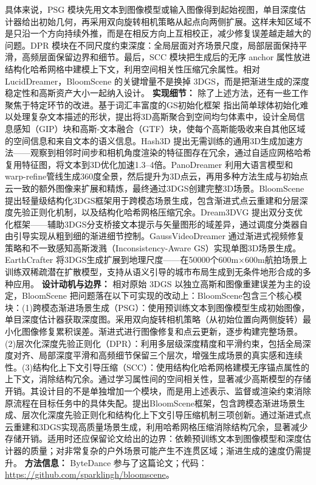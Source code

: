 具体来说，PSG 模块先用文本到图像模型或输入图像得到起始视图，单目深度估计器给出初始几何，再采用双向旋转相机策略从起点向两侧扩展。这样未知区域不是只沿一个方向持续外推，而是在相反方向上互相校正，减少修复误差越走越大的问题。DPR 模块在不同尺度约束深度：全局层面对齐场景尺度，局部层面保持平滑，高频层面保留边界和细节。最后，SCC 模块把生成后的无序 anchor 属性放进结构化哈希网格中建模上下文，利用空间相关性压缩冗余属性。相对 LucidDreamer，BloomScene 的关键增量不是换掉 3DGS，而是把渐进生成的深度稳定性和高斯资产大小一起纳入设计。
\textbf{实现细节：} 除了上述方法，还有一些工作聚焦于特定环节的改进。基于词汇丰富度的GS初始化框架 指出简单球体初始化难以处理复杂文本描述的形状，提出将3D高斯聚合到空间均匀体素中，设计全局信息感知（GIP）块和高斯-文本融合（GTF）块，使每个高斯能吸收来自其他区域的空间信息和来自文本的语义信息。Hash3D 提出无需训练的通用3D生成加速方法——观察到相邻时间步和相机角度渲染的特征图存在冗余，通过自适应网格哈希复用特征图，将文本到3D优化加速1.3--4倍。PanoDreamer 利用大语言模型和warp-refine管线生成360度全景，然后提升为3D点云，再用多种方法生成与初始点云一致的额外图像来扩展和精炼，最终通过3DGS创建完整3D场景。BloomScene 提出轻量级结构化3DGS框架用于跨模态场景生成，包含渐进式点云重建和分层深度先验正则化机制，以及结构化哈希网格压缩冗余。Dream3DVG 提出双分支优化框架——辅助3DGS分支桥接文本提示与矢量图形的域差异，通过调度分类器自由引导实现从粗到细的渐进细节控制。GaussVideoDreamer 通过渐进式视频修复策略和不一致感知高斯泼溅（Inconsistency-Aware GS）实现单图3D场景生成。EarthCrafter 将3DGS生成扩展到地理尺度——在50000个600m$\times$600m航拍场景上训练双稀疏潜在扩散模型，支持从语义引导的城市布局生成到无条件地形合成的多种应用。
\textbf{设计动机与边界：} 相对原始 3DGS 以独立高斯和图像重建误差为主的设定，BloomScene 把问题落在以下可实现的改动上：BloomScene包含三个核心模块：(1)跨模态渐进场景生成（PSG）：使用预训练文本到图像模型生成初始图像，单目深度估计器获取深度图。采用双向旋转相机策略（从初始位置向两侧旋转）最小化图像修复累积误差。渐进式进行图像修复和点云更新，逐步构建完整场景。(2)层次化深度先验正则化（DPR）：利用多层级深度精度和平滑约束，包括全局深度对齐、局部深度平滑和高频细节保留三个层次，增强生成场景的真实感和连续性。(3)结构化上下文引导压缩（SCC）：使用结构化哈希网格建模无序锚点属性的上下文，消除结构冗余。通过学习属性间的空间相关性，显著减少高斯模型的存储开销。其设计目的不是单独增加一个模块，而是用上述表示、监督或渲染约束消除原流程在目标任务中的具体失配。提出BloomScene框架，包含跨模态渐进场景生成、层次化深度先验正则化和结构化上下文引导压缩机制三项创新。通过渐进式点云重建和3DGS实现高质量场景生成，利用哈希网格压缩消除结构冗余，显著减少存储开销。适用时还应保留论文给出的边界：依赖预训练文本到图像模型和深度估计器的质量；对非常复杂的户外场景可能产生不连贯区域；渐进生成的速度仍需提升。
\textbf{方法信息：} ByteDance 参与了这篇论文；代码：\url{https://github.com/sparklingh/bloomscene}。



